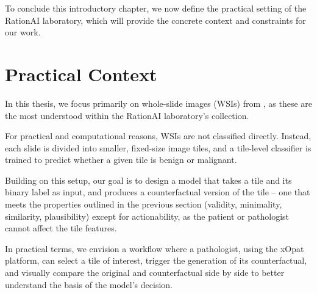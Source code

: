To conclude this introductory chapter,
we now define the practical setting of the RationAI laboratory,
which will provide the concrete context and constraints for our work.

\section{Practical Context}

In this thesis, we focus primarily on whole-slide images (WSIs) from \dataset,
as these are the most understood within the RationAI laboratory's collection.

For practical and computational reasons, WSIs are not classified directly.
Instead, each slide is divided into smaller, fixed-size image tiles,
and a tile-level classifier is trained to predict whether a given tile is benign or malignant.

Building on this setup, our goal is to design a model that
takes a tile and its binary label as input,
and produces a counterfactual version of the tile -- one that meets the properties outlined in the previous section
(validity, minimality, similarity, plausibility) except for actionability, as the patient or pathologist cannot affect the tile features.

In practical terms, we envision a workflow where a pathologist, using the xOpat platform, can select a tile of interest,
trigger the generation of its counterfactual,
and visually compare the original and counterfactual side by side
to better understand the basis of the model's decision.
